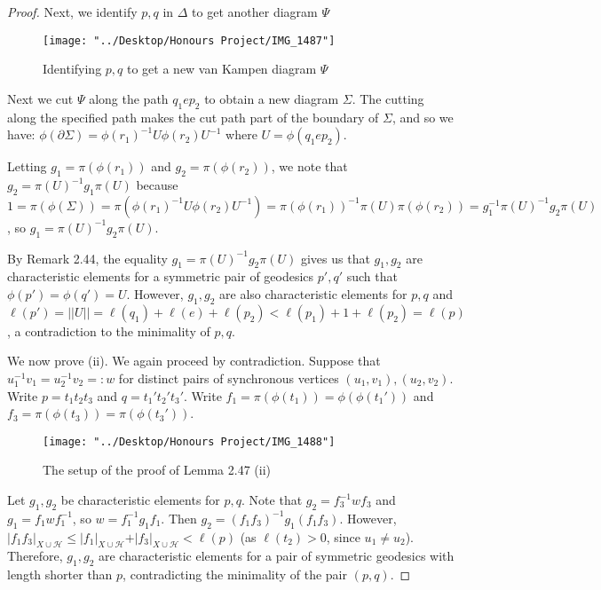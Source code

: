 \documentclass[12pt]{article}
\newcommand{\vs}{\vskip10pt}
\begin{document}
\begin{proof}
		Next, we identify $p,q$ in $\Delta$ to get another diagram $\Psi$
		
		
\begin{figure} [H]
	\centering
	\texttt{[image: "../Desktop/Honours Project/IMG\_1487"]}
	\caption{Identifying $p,q$ to get a new van Kampen diagram $\Psi$}
	\label{fig:img1487}
\end{figure}
		
		\vs 
		
		Next we cut $\Psi$ along the path $q_1 e p_2$ to obtain a new diagram $\Sigma$. The cutting along the specified path makes the cut path part of the boundary of $\Sigma$, and so we have: $\phi(\partial \Sigma) = \phi(r_1)^{-1} U \phi(r_2) U^{-1}$ where $U = \phi(q_1 e p_2)$. 
		
		\vs 
		
		Letting $g_1 = \pi(\phi(r_1))$ and $g_2 = \pi(\phi(r_2))$, we note that $g_2 = \pi(U)^{-1} g_1 \pi(U)$ because $1 = \pi(\phi(\Sigma)) = \pi(\phi(r_1)^{-1} U \phi(r_2) U^{-1}) = \pi(\phi(r_1))^{-1} \pi(U) \pi(\phi(r_2)) = g_1^{-1} \pi(U)^{-1} g_2 \pi(U)$, so $g_1 = \pi(U)^{-1} g_2 \pi(U)$. 
		
		\vs 
		
		By Remark 2.44, the equality $g_1 = \pi(U)^{-1} g_2 \pi(U)$ gives us that $g_1, g_2$ are characteristic elements for a symmetric pair of geodesics $p', q'$ such that $\phi(p') = \phi(q') = U$. However, $g_1, g_2$ are also characteristic elements for $p,q$ and $\ell(p') = \vert \vert U \vert \vert = \ell(q_1) + \ell(e) + \ell(p_2) < \ell(p_1) + 1 + \ell(p_2) = \ell(p)$, a contradiction to the minimality of $p,q$. 
		
		\vs 
		
		We now prove (ii). We again proceed by contradiction. Suppose that $u_1^{-1} v_1 = u_2^{-1} v_2 =: w$ for distinct pairs of synchronous vertices $(u_1, v_1), (u_2, v_2)$. Write $p = t_1 t_2 t_3$ and $q = t_1' t_2' t_3'$. Write $f_1 = \pi(\phi(t_1)) = \phi(\phi(t_1'))$ and $f_3 = \pi(\phi(t_3)) = \pi(\phi(t_3'))$. 
		
\begin{figure} [H]
	\centering
	\texttt{[image: "../Desktop/Honours Project/IMG\_1488"]}
	\caption{The setup of the proof of Lemma 2.47 (ii)}
	\label{fig:img1488}
\end{figure}

		\vs 
		
		Let $g_1, g_2$ be characteristic elements for $p,q$. Note that $g_2  = f_3^{-1} w f_3$ and $g_1 = f_1 w f_1^{-1}$, so $w = f_1^{-1} g_1 f_1$. Then $g_2 = (f_1 f_3)^{-1} g_1 (f_1 f_3)$. However, $\vert f_1 f_3 \vert_{X \cup \mathcal{H}} \leq \vert f_1 \vert_{X \cup \mathcal{H}} + \vert f_3 \vert_{X \cup \mathcal{H}} < \ell(p)$ (as $\ell(t_2) > 0$, since $u_1 \neq u_2$). Therefore, $g_1, g_2$ are characteristic elements for a pair of symmetric geodesics with length shorter than $p$, contradicting the minimality of the pair $(p,q)$.   
		
	\end{proof}
	
\end{document}
